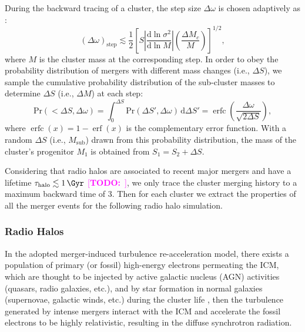 \documentclass[modern]{aastex61}
\newcommand{\R}[1]{\mathrm{#1}}
\newcommand{\D}[1]{\R{d} #1}
\newcommand{\diff}[2]{\frac{\D{#1}}{\D{#2}}}
\newcommand{\TODO}[1]{\textcolor{magenta}{[\textbf{TODO:}~\uuline{#1}]}}
\DeclareMathOperator{\erf}{erf}
\DeclareMathOperator{\erfc}{erfc}
\begin{document}
During the backward tracing of a cluster, the step size $\Delta\omega$
is chosen adaptively as \citep{randall2002}:
\begin{equation}
  \label{sec:dw-step}
  (\Delta\omega)_{\R{step}} \lesssim \frac{1}{2} \left[
    S \left| \diff{\ln \sigma^2}{\ln M} \right|
    \left( \frac{\Delta M_c}{M} \right) \right]^{1/2},
\end{equation}
where $M$ is the cluster mass at the corresponding step.
In order to obey the probability distribution of mergers with different
mass changes (i.e., $\Delta S$),
we sample the cumulative probability distribution of the sub-cluster masses
to determine $\Delta S$ (i.e., $\Delta M$) at each step:
\begin{equation}
  \label{sec:cdf-sub-masses}
  \R{Pr}(<\!\Delta S, \Delta\omega) =
  \int_0^{\Delta S} \R{Pr}(\Delta S', \Delta\omega) \,\D{\Delta S'} =
  \erfc \!\left( \frac{\Delta \omega}{\sqrt{2 \Delta S}} \right),
\end{equation}
where $\erfc(x) = 1 - \erf(x)$ is the complementary error function.
With a random $\Delta S$ (i.e., $M_{\R{sub}}$) drawn from this probability
distribution, the mass of the cluster's progenitor $M_1$ is obtained from
$S_1 = S_2 + \Delta S$.

Considering that radio halos are associated to recent major mergers and
have a lifetime $\tau_{\R{halo}} \lesssim \SI{1}{\Gyr}$
\citep{cassano2016} \TODO{change ref???},
we only trace the cluster merging history to a maximum backward time of
\SI{3}{\Gyr}.
Then for each cluster we extract the properties of all the merger events
for the following radio halo simulation.


\subsubsection{Radio Halos}
\label{sec:halos}

In the adopted merger-induced turbulence re-acceleration model, there
exists a population of primary (or fossil) high-energy electrons permeating
the ICM, which are thought to be injected by active galactic nucleus (AGN)
activities (quasars, radio galaxies, etc.), and by star formation in
normal galaxies (supernovae, galactic winds, etc.) during the cluster
life \citep[see][for a review]{blasi2007rev},
then the turbulence generated by intense mergers interact with the ICM
and accelerate the fossil electrons to be highly relativistic, resulting
in the diffuse synchrotron radiation.
\end{document}
